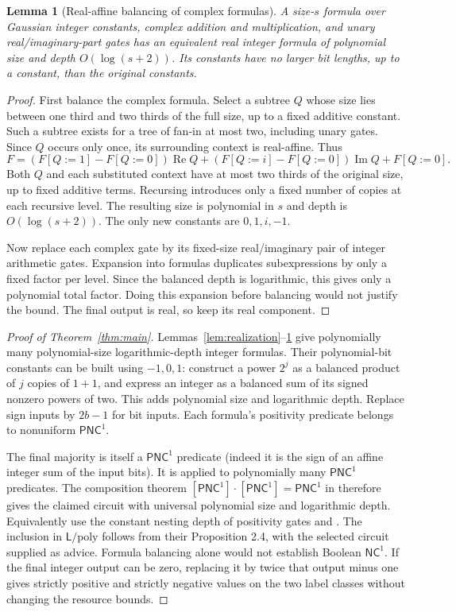\documentclass[11pt]{article}
\newtheorem{lemma}[theorem]{Lemma}
\theoremstyle{remark}\newtheorem{remark}[theorem]{Remark}
\newcommand{\PNC}{\mathsf{PNC}}
\newcommand{\NC}{\mathsf{NC}}
\newcommand{\Lpoly}{\mathsf L/\mathrm{poly}}
\newcommand{\Rea}{\operatorname{Re}}
\newcommand{\Ima}{\operatorname{Im}}
\begin{document}
\begin{lemma}[Real-affine balancing of complex formulas]
\label{lem:balancing}
A size-$s$ formula over Gaussian integer constants, complex addition
and multiplication, and unary real/imaginary-part gates has an
equivalent real integer formula of polynomial size and depth $O(\log(s+2))$.
Its constants have no larger bit lengths, up to a constant, than the
original constants.
\end{lemma}
\begin{proof}
First balance the complex formula. Select a subtree $Q$ whose size
lies between one third and two thirds of the full size, up to a fixed
additive constant. Such a subtree exists for a tree of fan-in at most
two, including unary gates. Since $Q$ occurs only once, its surrounding
context is real-affine. Thus
\[
 F=(F[Q:=1]-F[Q:=0])\Rea Q
   +(F[Q:=i]-F[Q:=0])\Ima Q+F[Q:=0].
\]
Both $Q$ and each substituted context have at most two thirds of
the original size, up to fixed additive terms. Recursing introduces
only a fixed number of copies at each recursive level. The resulting
size is polynomial in $s$ and depth is $O(\log(s+2))$. The only new
constants are $0,1,i,-1$.

Now replace each complex gate by its fixed-size real/imaginary pair
of integer arithmetic gates. Expansion into formulas duplicates
subexpressions by only a fixed factor per level. Since the balanced
depth is logarithmic, this gives only a polynomial total factor.
Doing this expansion before balancing would not justify the bound.
The final output is real, so keep its real component.
\end{proof}

\begin{proof}[Proof of Theorem~\ref{thm:main}]
Lemmas~\ref{lem:realization}--\ref{lem:balancing} give polynomially
many polynomial-size logarithmic-depth integer formulas. Their
polynomial-bit constants can be built using $-1,0,1$: construct a
power $2^j$ as a balanced product of $j$ copies of $1+1$, and express
an integer as a balanced sum of its signed nonzero powers of two.
This adds polynomial size and logarithmic depth. Replace sign inputs
by $2b-1$ for bit inputs. Each formula's positivity predicate belongs
to nonuniform $\PNC^1$.

The final majority is itself a $\PNC^1$ predicate (indeed it is the
sign of an affine integer sum of the input bits). It is applied to
polynomially many $\PNC^1$ predicates. The composition theorem
$[\PNC^1]\cdot[\PNC^1]=\PNC^1$ in \cite[Theorem 4.2]{datta}
therefore gives the claimed circuit with universal polynomial size
and logarithmic depth. Equivalently use the constant nesting depth
of positivity gates and \cite[Proposition 3.4 and Theorem 4.1]{datta}.
The inclusion in $\Lpoly$ follows from their Proposition 2.4, with
the selected circuit supplied as advice. Formula balancing alone
would not establish Boolean $\NC^1$.
If the final integer output can be zero, replacing it by twice that
output minus one gives strictly positive and strictly negative values
on the two label classes without changing the resource bounds.
\end{proof}
\end{document}
